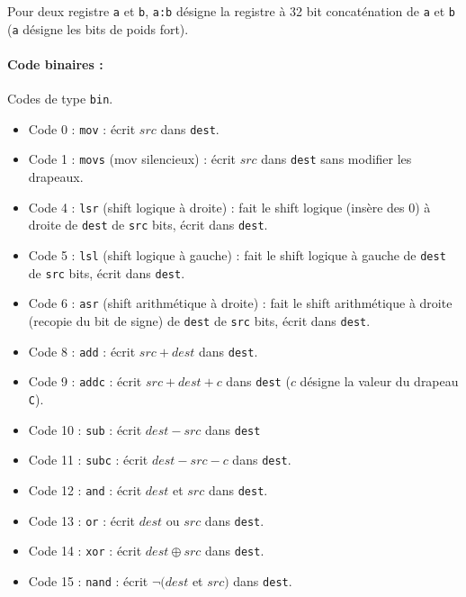\documentclass[12pt]{article}
\begin{document}
Pour deux registre \verb!a! et \verb!b!, \verb!a:b! désigne la registre à 32 bit
concaténation de \verb!a! et \verb!b! (\verb!a! désigne les bits de poids fort).


\paragraph{Code binaires :} Codes de type \verb!bin!.
\begin{itemize}
\item Code 0 : \verb!mov! : écrit $src$ dans \verb!dest!.
\item Code 1 : \verb!movs! (mov silencieux) : écrit $src$ dans \verb!dest!
  sans modifier les drapeaux.
\item Code 4 : \verb!lsr! (shift logique à droite) : fait le shift logique
  (insère des 0) à droite de \verb!dest! de \verb!src! bits, écrit dans \verb!dest!.
\item Code 5 : \verb!lsl! (shift logique à gauche) : fait le shift logique à
  gauche de \verb!dest! de \verb!src! bits, écrit dans \verb!dest!.
\item Code 6 : \verb!asr! (shift arithmétique à droite) : fait le shift arithmétique à
  droite (recopie du bit de signe) de \verb!dest! de \verb!src! bits, écrit dans \verb!dest!.
\item Code 8 : \verb!add! : écrit $src + dest$ dans \verb!dest!.
\item Code 9 : \verb!addc! : écrit $src + dest + c$ dans \verb!dest! ($c$
  désigne la valeur du drapeau \verb!C!).
\item Code 10 : \verb!sub! : écrit $dest - src$ dans \verb!dest!
\item Code 11 : \verb!subc! : écrit $dest - src -c $ dans \verb!dest!.
\item Code 12 : \verb!and! : écrit $dest$ et $src$ dans \verb!dest!.
\item Code 13 : \verb!or! : écrit $dest$ ou $src$ dans \verb!dest!.
\item Code 14 : \verb!xor! : écrit $dest \oplus src$ dans \verb!dest!.
\item Code 15 : \verb!nand! : écrit $\neg(dest$ et $src)$ dans \verb!dest!.

\end{itemize}
\end{document}
